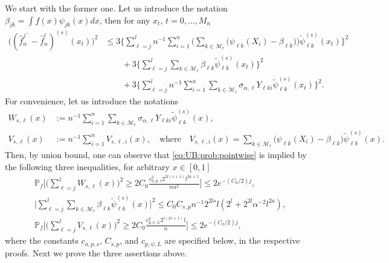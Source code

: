 \documentclass[preprint]{imsart}
\renewcommand{\P}{\mathbb{P}}
\numberwithin{equation}{section}
\begin{document}
\begin{appendix}
We start with the former one. Let us introduce the notation $\beta_{jk}=\int f(x) \psi_{jk}(x)dx$, then for any $x_t$, $t=0,...,M_n$
\begin{align}
\big( (\hat{f}_n^{j^-} -\hat{f}_n^l)^{(s)}(x_t)\big)^2&\leq
3\Big\{ \sum_{\ell=j}^{l}  n^{-1}\sum_{i=1}^n   \Big(\sum_{k\in\mathcal{M}_\ell} \big(\psi_{\ell k}(X_i)-\beta_{\ell k} \big) \Big) \tilde\psi_{\ell k}^{(s)}(x_t)\Big\}^2 \nonumber\\
&\qquad +3\Big\{\sum_{\ell=j}^{l} \sum_{k\in\mathcal{M}_\ell} \beta_{\ell k}  \tilde\psi_{\ell k}^{(s)}(x_t)\Big\}^2\nonumber\\
&\qquad+ 3 \Big\{\sum_{\ell=j}^{l}  n^{-1}\sum_{i=1}^n \sum_{k\in\mathcal{M}_\ell}  \sigma_{\alpha,\ell}Y_{\ell k i} \tilde\psi_{\ell k}^{(s)}(x_t)\Big\}^2.\label{eq:BiasEst_pointwise}
\end{align}
For convenience, let us introduce the notations
\begin{align*}
W_{s,\ell}(x)&:=n^{-1}\sum_{i=1}^n\sum_{k\in\mathcal{M}_\ell} \sigma_{\alpha,\ell}Y_{\ell k i} \tilde\psi_{\ell k}^{(s)}(x),\\
V_{s,\ell}(x)&:=n^{-1}\sum_{i=1}^n V_{s,\ell,i}(x),\quad\text{where}\quad 
V_{s,\ell,i}(x)= \sum_{k\in\mathcal{M}_\ell} \big(\psi_{\ell k}(X_i)-\beta_{\ell k} \big)  \tilde\psi_{\ell k}^{(s)}(x).
\end{align*}
Then, by union bound, one can observe that \eqref{eq:UB:prob:pointwise} is implied by the following three inequalities, for arbitrary $x\in[0,1]$
\begin{align}
&\P_f\Big[ \Big(\sum_{\ell=j}^{l} W_{s,\ell}(x)\Big)^2\geq 2C_0\frac{c_{a,p,s}^2 2^{2l(s+1)} l^{2a+1}}{n\alpha^2}  \Big]\leq 2 e^{-(C_0/2)j},\label{eq:help1:Laplace_pointwise_adapt}\\
&\Big| \sum_{\ell=j}^{l} \sum_{k\in\mathcal{M}_\ell} \beta_{\ell k}  \tilde\psi_{\ell k}^{(s)}(x)\Big|^2\leq C_0 C_{s,p} n^{-1}2^{2ls}l(2^{l}+2^{2l}\alpha^{-2}l^{2a}),\label{eq:help2:Laplace_pointwise}\\
&\P_f\Big[ \Big(\sum_{\ell=j}^{l} V_{s,\ell}(x)\Big)^2\geq 2C_0\frac{c_{p,\psi,L}^2 2^{l(2s+1)}l}{n}  \Big]\leq  2 e^{-(C_0/2)j},\label{eq:help3:Laplace_pointwise}
\end{align}
where the constants $c_{a,p,s}$, $C_{s,p}$, and $c_{p,\psi,L}$ are specified below, in the respective proofs. Next we prove the three assertions above.\\




\end{appendix}
\end{document}
